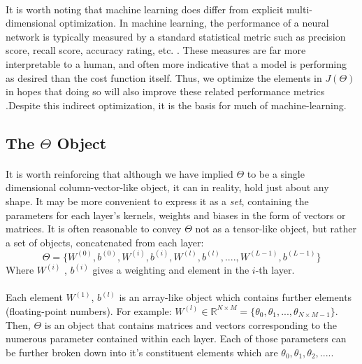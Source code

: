 \documentclass[12pt,letterpaper]{article}
\begin{document}
\paragraph*{}It is worth noting that machine learning does differ from explicit multi-dimensional optimization. In machine learning, the performance of a neural network is typically measured by a standard statistical metric such as precision score, recall score, accuracy rating, etc. \cite{Geron}. These measures are far more interpretable to a human, and often more indicative that a model is performing as desired than the cost function itself. Thus, we optimize the elements in $J(\Theta)$ in hopes that doing so will also improve these related performance metrics \cite{Goodfellow}.Despite this indirect optimization, it is the basis for much of machine-learning.

\subsection{The $\Theta$ Object}

\paragraph*{}It is worth reinforcing that although we have implied $\Theta$ to be a single dimensional column-vector-like object, it can in reality, hold just about any shape. It may be more convenient to express it as a \textit{set}, containing the parameters for each layer's kernels, weights and biases in the form of vectors or matrices. It is often reasonable to convey $\Theta$ not as a tensor-like object, but rather a set of objects, concatenated from each layer: 
\begin{equation}
\Theta = \big\{ W^{(0)} , b^{(0)} , W^{(i)} , b^{(i)}, W^{(l)} , b^{(l)}, ....,
W^{(L-1)} , b^{(L-1)} \big\} 
\end{equation}
Where $W^{(i)}$ , $b^{(i)}$ gives a weighting and element in the $i$-th layer. 

\paragraph*{}Each element  $W^{(1)}$, $b^{(l)}$ is an array-like object which contains further elements (floating-point numbers). For example: 
$W^{(l)} \in \mathbb{R}^{N \times M} = \big\{ \theta_0 , \theta_1 , ... , \theta_{N \times M - 1} \big\}$. Then, $\Theta$ is an object that contains matrices and vectors corresponding to the numerous parameter contained within each layer. Each of those parameters can be further broken down into it's constituent elements which are $\theta_0 , \theta_1 , \theta_2 , .... $. 
\end{document}
